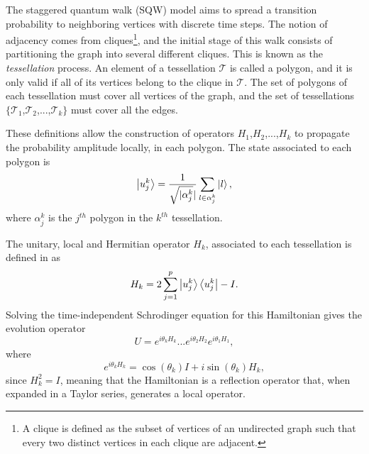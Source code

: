\documentclass[../../dissertation.tex]{subfiles}
\begin{document}
The staggered quantum walk (SQW) model aims to spread a transition probability
to neighboring vertices with discrete time steps. The notion of adjacency comes
from cliques\footnote{A clique is defined as the subset of vertices of an
	undirected graph such that every two distinct vertices in each clique
are adjacent.}, and the initial stage of this walk consists of partitioning the
graph into several different cliques. This is known as the \textit{tessellation} process. An
element of a tessellation $\mathscr{T}$ is called a polygon, and it is only
valid if all of its vertices belong to the clique in $\mathscr{T}$. The set of
polygons of each tessellation must cover all vertices of the graph, and the set
of tessellations $\{\mathscr{T}_{1}$,$\mathscr{T}_{2}$,...,$\mathscr{T}_{k}\}$
must cover all the edges.\par 

These definitions allow the construction of operators $H_1$,$H_2$,...,$H_k$ to
propagate the probability amplitude locally, in each polygon. The state
associated to each polygon is
\begin{equation}
	\ket{u_{j}^{k}} = \frac{1}{\sqrt{\mathopen|\alpha_{j}^{k}}\mathclose|}\sum_{l\in\alpha_{j}^{k}}\ket{l},
\end{equation}
where $\alpha_{j}^{k}$ is the $j^{th}$ polygon in the $k^{th}$ tessellation.\par

The unitary, local and Hermitian operator $H_k$, associated to each tessellation is
defined in \cite{portugal2017b} as
\begin{equation}
	H_k = 2\sum_{j=1}^{p}\ket{u_{j}^{k}}\bra{u_{j}^{k}} - I.
	\label{eq:StagHamil}
\end{equation}
Solving the time-independent Schrodinger equation for this Hamiltonian gives
the evolution operator 
\begin{equation}
	U = e^{i\theta_{k}H_{k}}...e^{i\theta_{2}H_{2}}e^{i\theta_{1}H_{1}},
	\label{eq:stagWalkUnmodOp}
\end{equation}
where
\begin{equation}
	e^{i\theta_{k}H_{k}} = \cos{(\theta_k)}I + i\sin{(\theta_k)}H_k,
\end{equation}
since $H_k^2 = I$, meaning that the Hamiltonian is a reflection operator that,
when expanded in a Taylor series, generates a local operator.\par
\end{document}
